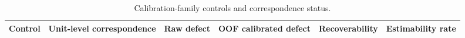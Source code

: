 \begin{table}[t]
\caption{Calibration-family controls and correspondence status.}
\label{tab:exp4_calibration_controls}
\begin{tabular}{llrrrr}
\toprule
Control & Unit-level correspondence & Raw defect & OOF calibrated defect & Recoverability & Estimability rate \\
\midrule
\bottomrule
\end{tabular}
\end{table}

